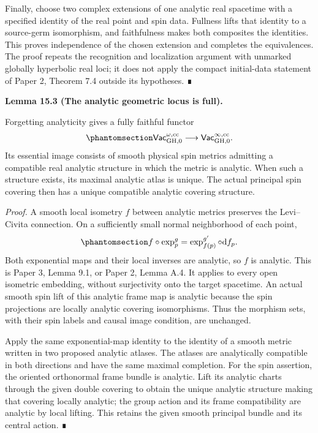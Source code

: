 \documentclass[
  english,
  11pt,
  reqno]{amsart}
\makeatletter
\newcommand{\pandocstatementheading}[1]{%
  \par\addpenalty{\@beginparpenalty}%
  \addvspace{.5\baselineskip plus .2\baselineskip minus .2\baselineskip}%
  {\normalfont\bfseries #1\par}%
  \nobreak\@afterindenttrue\@afterheading
}
\makeatother
\begin{document}
Finally, choose two complex extensions of one analytic real spacetime
with a specified identity of the real point and spin data. Fullness
lifts that identity to a source-germ isomorphism, and faithfulness makes
both composites the identities. This proves independence of the chosen
extension and completes the equivalences. The proof repeats the
recognition and localization argument with unmarked globally hyperbolic
real loci; it does not apply the compact initial-data statement of Paper
2, Theorem 7.4 outside its hypotheses. ∎

\pandocstatementheading{\protect{}\label{lem:analytic-geometric-locus-fullness}Lemma 15.3 (The analytic geometric locus is full).}

Forgetting analyticity gives a fully faithful functor
\begin{equation}\protect\phantomsection\label{eq:analytic-geometric-locus-inclusion}{
\mathsf{Vac}^{\omega,\mathrm{cc}}_{\mathrm{GH},0}
\longrightarrow
\mathsf{Vac}^{\infty,\mathrm{cc}}_{\mathrm{GH},0}.
}\end{equation} Its essential image consists of smooth physical spin
metrics admitting a compatible real analytic structure in which the
metric is analytic. When such a structure exists, its maximal analytic
atlas is unique. The actual principal spin covering then has a unique
compatible analytic covering structure.

\emph{Proof.} A smooth local isometry \(f\) between analytic metrics
preserves the Levi--Civita connection. On a sufficiently small normal
neighborhood of each point,
\begin{equation}\protect\phantomsection\label{eq:analytic-embedding-normal-coordinate-proof}{
f\circ\exp_p^{g}
=\exp_{f(p)}^{g'}\circ\mathrm df_p.
}\end{equation} Both exponential maps and their local inverses are
analytic, so \(f\) is analytic. This is Paper 3, Lemma 9.1, or Paper 2,
Lemma A.4. It applies to every open isometric embedding, without
surjectivity onto the target spacetime. An actual smooth spin lift of
this analytic frame map is analytic because the spin projections are
locally analytic covering isomorphisms. Thus the morphism sets, with
their spin labels and causal image condition, are unchanged.

Apply the same exponential-map identity to the identity of a smooth
metric written in two proposed analytic atlases. The atlases are
analytically compatible in both directions and have the same maximal
completion. For the spin assertion, the oriented orthonormal frame
bundle is analytic. Lift its analytic charts through the given double
covering to obtain the unique analytic structure making that covering
locally analytic; the group action and its frame compatibility are
analytic by local lifting. This retains the given smooth principal
bundle and its central action. ∎
\end{document}
